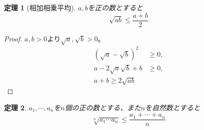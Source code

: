 \documentclass{ltjsarticle}
\newtheorem{theorem}{定理}[section]
\begin{document}
\begin{theorem}[相加相乗平均]
$a,b$を正の数とすると
\begin{equation*}
\sqrt{ab}\leq {\frac {a+b}2}
\end{equation*}
\label{theorem_amgm}
\end{theorem}
\begin{proof}
$a,b>0$より$\sqrt{a},\sqrt{b}>0$。
\begin{align*}
(\sqrt{a}-\sqrt{b})^2 &\geq0,\\
a-2\sqrt{a}\sqrt{b}+b&\geq0,\\
a+b\geq 2\sqrt{ab}
\end{align*}
\end{proof}

\begin{theorem}
$a_1,\cdots,a_n$を$n$個の正の数とする、また$n$を自然数とすると
\begin{equation*}
\sqrt[n]{a_1\cdots a_n}\leq {\frac {a_1+\cdots+a_n} {n}}
\end{equation*}
\label{theorem_amgm_general}
\end{theorem}
\end{document}
